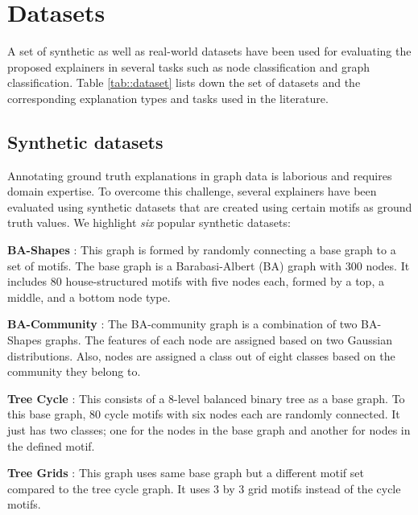 
\section{Datasets}
\label{sec:sourav_:datasets}


A set of synthetic as well as real-world datasets have been used for evaluating the proposed explainers in several tasks such as node classification and graph classification. Table \ref{tab::dataset} lists down the set of datasets and the corresponding explanation types and tasks used in the literature.
\subsection{Synthetic datasets}
Annotating ground truth explanations in graph data is laborious and requires domain expertise. To overcome this challenge, several explainers have been evaluated using synthetic datasets that are created using certain motifs as ground truth values. We highlight \textit{six} popular synthetic datasets:%

\noindent\textbf{BA-Shapes} \cite{ying2019gnnexplainer}: This graph is formed by randomly connecting a base graph to a set of motifs. The base graph is a Barabasi-Albert (BA) graph with $300$ nodes. It includes $80$ house-structured motifs with five nodes each, formed by a top, a middle, and a bottom node type. 
    
\noindent\textbf{BA-Community} \cite{ying2019gnnexplainer}: The BA-community graph is a combination of two BA-Shapes graphs. The features of each node are assigned based on two Gaussian distributions. Also, nodes are assigned a class out of eight classes based on the community they belong to.

\noindent\textbf{Tree Cycle} \cite{ying2019gnnexplainer}: This consists of a 8-level balanced binary tree as a base graph. To this base graph, 80 cycle motifs with six nodes each are randomly connected. It just has two classes; one for the nodes in the base graph and another for nodes in the defined motif.
    
\noindent\textbf{Tree Grids} \cite{ying2019gnnexplainer}: This graph uses same base graph but a different motif set compared to the tree cycle graph. It uses 3 by 3 grid motifs instead of the cycle motifs.
    
